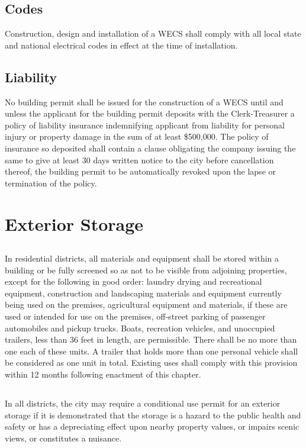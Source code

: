 \subsection{Codes}
Construction, design and installation of a WECS shall comply with all local state and national electrical codes in effect at the time of installation.
\subsection{Liability}
No building permit shall be issued for the construction of a WECS until and unless the applicant for the building permit deposits with the Clerk-Treasurer a policy of liability insurance indemnifying applicant from liability for personal injury or property damage in the sum of at least \$500,000. The policy of insurance so deposited shall contain a clause obligating the company issuing the same to give at least 30 days written notice to the city before cancellation thereof, the building permit to be automatically revoked upon the lapse or termination of the policy.

\section{Exterior Storage}
\subsection{}
In residential districts, all materials and equipment shall be stored within a building or be fully screened so as not to be visible from adjoining properties, except for the following in good order: laundry drying and recreational equipment, construction and landscaping materials and equipment currently being used on the premises, agricultural equipment and materials, if these are used or intended for use on the premises, off-street parking of passenger automobiles and pickup trucks. Boats, recreation vehicles, and unoccupied trailers, less than 36 feet in length, are permissible. There shall be no more than one each of these units. A trailer that holds more than one personal vehicle shall be considered as one unit in total.  Existing uses shall comply with this provision within 12 months following enactment of this chapter.
\subsection{}
In all districts, the city may require a conditional use permit for an exterior storage if it is demonstrated that the storage is a hazard to the public health and safety or has a depreciating effect upon nearby property values, or impairs scenic views, or constitutes a nuisance.

